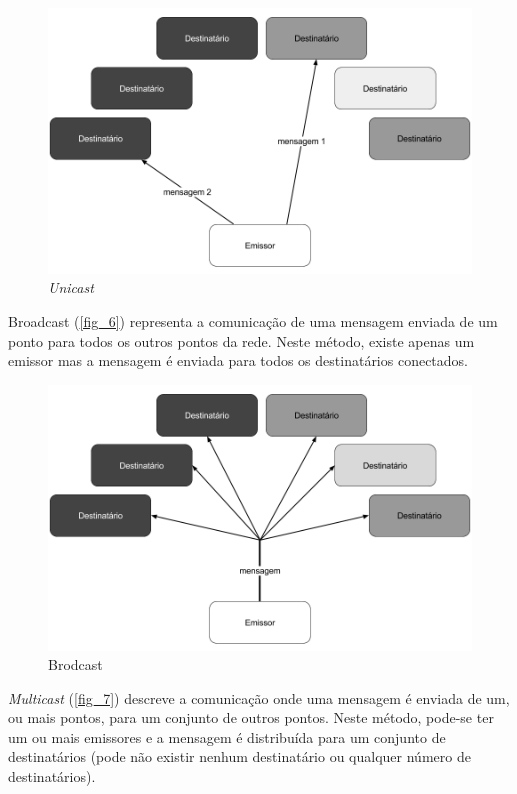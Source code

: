 \documentclass[
12pt,				%
openright,			%
oneside,			%
a4paper,			%
brazil,				%
]{abntex2}
\begin{document}
	\begin{figure} [H]
		\centering
		\includegraphics[scale=.45]{figuras/cap2/05Unicast}
		\caption{\label{fig_5}\textit{Unicast}}
	\end{figure}
		
	\par Broadcast (\autoref{fig_6}) representa a comunicação de uma mensagem enviada de um ponto para todos os outros pontos da rede. Neste método, existe apenas um emissor mas a mensagem é enviada para todos os destinatários conectados.
	
	\begin{figure} [H]
		\centering
		\includegraphics[scale=.45]{figuras/cap2/06Broadcast}
		\caption{\label{fig_6}Brodcast}
	\end{figure}
	
	\par \textit{Multicast} (\autoref{fig_7}) descreve a comunicação onde uma mensagem é enviada de um, ou mais pontos, para um conjunto de outros pontos. Neste método, pode-se ter um ou mais emissores e a mensagem é distribuída para um conjunto de destinatários (pode não existir nenhum destinatário ou qualquer número de destinatários).
	
\end{document}

